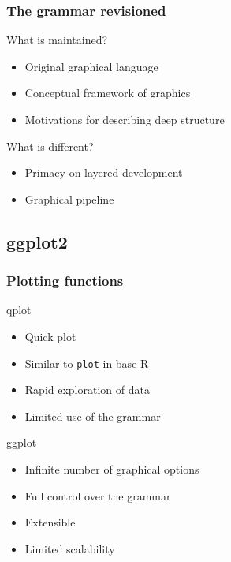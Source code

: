 \documentclass{beamer}
\begin{document}
\begin{frame}\frametitle{The grammar revisioned}
\begin{block}{What is maintained?}
	\begin{itemize}
		\item Original graphical language
		\item Conceptual framework of graphics
		\item Motivations for describing deep structure
	\end{itemize}
\end{block}

\medskip

\begin{alertblock}{What is different?}
	\begin{itemize}
	\item Primacy on layered development
	\item Graphical pipeline
	\end{itemize}
\end{alertblock}
\end{frame}

\subsection{ggplot2}

\begin{frame}\frametitle{Plotting functions}
\begin{alertblock}{qplot}
	\begin{itemize}
		\item Quick plot 
		\item Similar to \texttt{plot} in base R
		\item Rapid exploration of data
		\item Limited use of the grammar
	\end{itemize}
\end{alertblock}

\begin{exampleblock}{ggplot}
	\begin{itemize}
		\item Infinite number of graphical options
		\item Full control over the grammar
		\item Extensible
		\item Limited scalability
	\end{itemize}
\end{exampleblock}
\end{frame}
\end{document}
